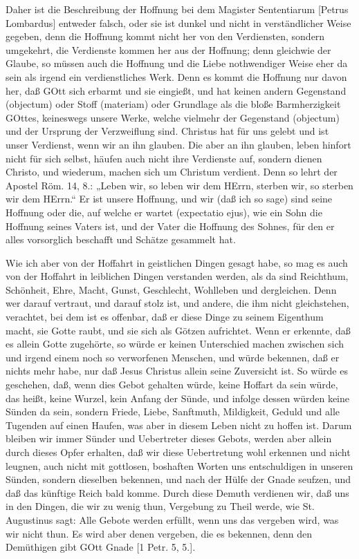 Daher ist die Beschreibung der Hoffnung bei dem Magister Sententiarum [Petrus Lombardus] entweder falsch, oder sie ist dunkel und nicht in verständlicher Weise gegeben, denn die Hoffnung kommt nicht her von den Verdiensten, sondern umgekehrt, die Verdienste kommen her aus der Hoffnung; denn gleichwie der Glaube, so müssen auch die Hoffnung und die Liebe nothwendiger Weise eher da sein als irgend ein verdienstliches Werk. Denn es kommt die Hoffnung nur davon her, daß GOtt sich erbarmt und sie eingießt, und hat keinen andern Gegenstand (objectum) oder Stoff (materiam) oder Grundlage als die bloße Barmherzigkeit GOttes, keineswegs unsere Werke, welche vielmehr der Gegenstand (objectum) und der Ursprung der Verzweiflung sind. Christus hat für uns gelebt und ist unser Verdienst, wenn wir an ihn glauben. Die aber an ihn glauben, leben hinfort nicht für sich selbst, häufen auch nicht ihre Verdienste auf, sondern dienen Christo, und wiederum, machen sich um Christum verdient. Denn so lehrt der Apostel Röm. 14, 8.: „Leben wir, so leben wir dem HErrn, sterben wir, so sterben wir dem HErrn.“ Er ist unsere Hoffnung, und wir (daß ich so sage) sind seine Hoffnung oder die, auf welche er wartet (expectatio ejus), wie ein Sohn die Hoffnung seines Vaters ist, und der Vater die Hoffnung des Sohnes, für den er alles vorsorglich beschafft und Schätze gesammelt hat.

Wie ich aber von der Hoffahrt in geistlichen Dingen gesagt habe, so mag es auch von der Hoffahrt in leiblichen Dingen verstanden werden, als da sind Reichthum, Schönheit, Ehre, Macht, Gunst, Geschlecht, Wohlleben und dergleichen. Denn wer darauf vertraut, und darauf stolz ist, und andere, die ihm nicht gleichstehen, verachtet, bei dem ist es offenbar, daß er diese Dinge zu seinem Eigenthum macht, sie
Gotte raubt, und sie sich als Götzen aufrichtet. Wenn er erkennte, daß es allein Gotte zugehörte, so würde er keinen Unterschied machen zwischen sich und irgend einem noch so verworfenen Menschen, und würde bekennen, daß er nichts mehr habe, nur daß Jesus Christus allein seine Zuversicht ist. So würde es geschehen, daß, wenn dies Gebot gehalten würde, keine Hoffart da sein würde, das heißt, keine Wurzel, kein Anfang der Sünde, und infolge dessen würden keine Sünden da sein, sondern Friede, Liebe, Sanftmuth, Mildigkeit, Geduld und alle Tugenden auf einen Haufen, was aber in diesem Leben nicht zu hoffen ist. Darum bleiben wir immer Sünder und Uebertreter dieses Gebots, werden aber allein durch dieses Opfer erhalten, daß wir diese Uebertretung wohl erkennen und nicht leugnen, auch nicht mit gottlosen, boshaften Worten uns entschuldigen in unseren Sünden, sondern dieselben bekennen, und nach der Hülfe der Gnade seufzen, und daß das künftige Reich bald komme. Durch diese Demuth verdienen wir, daß uns in den Dingen, die wir zu wenig thun, Vergebung zu Theil werde, wie St. Augustinus sagt: Alle Gebote werden erfüllt, wenn uns das vergeben wird, was wir nicht thun. Es wird aber denen vergeben, die es bekennen, denn den Demüthigen gibt GOtt Gnade [1 Petr. 5, 5.].

